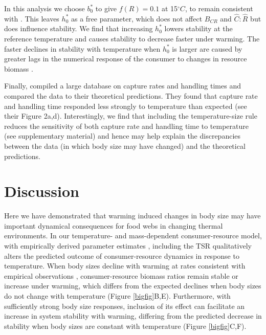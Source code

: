 \documentclass[11pt]{article}
\begin{document}
In this analysis we choose $b_0^*$ to give $f(R) = 0.1$ at 15$^\circ C$, to remain consistent with \cite{Gilbert2014}.
This leaves $h_0^*$ as a free parameter, which does not affect $B_{CR}$ and $\hat{C}:\hat{R}$ but does influence stability. 
We find that increasing $h_0^*$ lowers stability at the reference temperature and causes stability to decrease faster under warming.
The faster declines in stability with temperature when $h_0^*$ is larger are caused by greater lags in the numerical response of the consumer to changes in resource biomass \citep{Murdoch2003}.

Finally, \cite{Rall2012} compiled a large database on capture rates and handling times and compared the data to their theoretical predictions.
They found that capture rate and handling time responded less strongly to temperature than expected (see their Figure 2a,d).
Interestingly, we find that including the temperature-size rule reduces the sensitivity of both capture rate and handling time to temperature (see supplementary material) and hence may help explain the discrepancies between the data (in which body size may have changed) and the theoretical predictions. 

\section*{Discussion}

Here we have demonstrated that warming induced changes in body size may have important dynamical consequences for food webs in changing thermal environments. 
In our temperature- and mass-dependent consumer-resource model, with empirically derived parameter estimates \citep[compiled in][]{Gilbert2014,DeLong2015,Rall2012}, including the TSR qualitatively alters the predicted outcome of consumer-resource dynamics in response to temperature. 
When body sizes decline with warming at rates consistent with empirical observations \citep{Forster2012,Horne2015}, consumer-resource biomass ratios remain stable or increase under warming, which differs from the expected declines when body sizes do not change with temperature (Figure \ref{bigfig}B,E). 
Furthermore, with sufficiently strong body size responses, inclusion of its effect can facilitate an increase in system stability with warming, differing from the predicted decrease in stability when body sizes are constant with temperature (Figure \ref{bigfig}C,F). 
\end{document}
